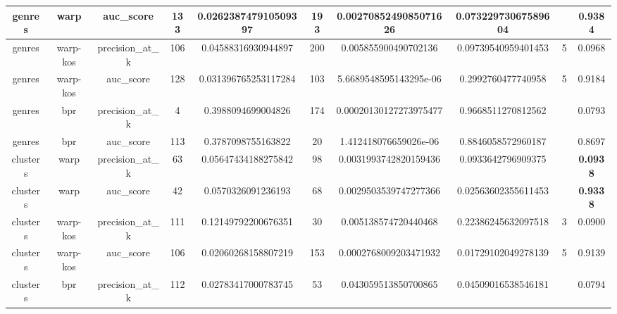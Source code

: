 \begin{table}
{\begin{tabular}{|c|c|c|c|c|c|c|c|c|c|}
\hline
genres                    & warp                  & auc\_score                & 133    & 0.026238747910509397  & 193           & 0.0027085249085071626  & 0.07322973067589604   &      & \textbf{0.9384}                    \\ 
\hline
genres                    & warp-kos              & precision\_at\_k          & 106    & 0.04588316930944897   & 200           & 0.005855900490702136   & 0.09739540959401453   & 5    & 0.0968                    \\ 
\hline
genres                    & warp-kos              & auc\_score                & 128    & 0.031396765253117284  & 103           & 5.6689548595143295e-06 & 0.2992760477740958    & 5    & 0.9184                    \\ 
\hline
genres                    & bpr                   & precision\_at\_k          & 4      & 0.3988094699004826    & 174           & 0.00020130127273975477 & 0.9668511270812562    &      & 0.0793                    \\ 
\hline
genres                    & bpr                   & auc\_score                & 113    & 0.3787098755163822    & 20            & 1.412418076659026e-06  & 0.8846058572960187    &      & 0.8697                    \\ 
\hline
clusters                  & warp                  & precision\_at\_k          & 63     & 0.05647434188275842   & 98            & 0.0031993742820159436  & 0.0933642796909375    &      & \textbf{0.0938}                    \\ 
\hline
clusters                  & warp                  & auc\_score                & 42     & 0.0570326091236193    & 68            & 0.0029503539747277366  & 0.02563602355611453   &      & \textbf{0.9338}                    \\ 
\hline
clusters                  & warp-kos              & precision\_at\_k          & 111    & 0.12149792200676351   & 30            & 0.005138574720440468   & 0.22386245632097518   & 3    & 0.0900                    \\ 
\hline
clusters                  & warp-kos              & auc\_score                & 106    & 0.02060268158807219   & 153           & 0.0002768009203471932  & 0.01729102049278139   & 5    & 0.9139                    \\ 
\hline
clusters                  & bpr                   & precision\_at\_k          & 112    & 0.02783417000783745   & 53            & 0.043059513850700865   & 0.04509016538546181   &      & 0.0794                    \\ 

\end{tabular}}
\end{table}
